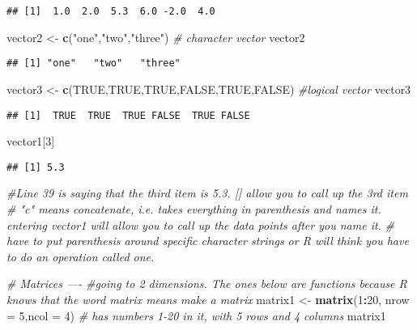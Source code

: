 \documentclass[]{article}
\newenvironment{Shaded}{\begin{snugshade}}{\end{snugshade}}
\newcommand{\KeywordTok}[1]{\textcolor[rgb]{0.13,0.29,0.53}{\textbf{#1}}}
\newcommand{\DataTypeTok}[1]{\textcolor[rgb]{0.13,0.29,0.53}{#1}}
\newcommand{\DecValTok}[1]{\textcolor[rgb]{0.00,0.00,0.81}{#1}}
\newcommand{\StringTok}[1]{\textcolor[rgb]{0.31,0.60,0.02}{#1}}
\newcommand{\CommentTok}[1]{\textcolor[rgb]{0.56,0.35,0.01}{\textit{#1}}}
\newcommand{\OtherTok}[1]{\textcolor[rgb]{0.56,0.35,0.01}{#1}}
\newcommand{\OperatorTok}[1]{\textcolor[rgb]{0.81,0.36,0.00}{\textbf{#1}}}
\newcommand{\NormalTok}[1]{#1}
\begin{document}
\begin{verbatim}
## [1]  1.0  2.0  5.3  6.0 -2.0  4.0
\end{verbatim}

\begin{Shaded}
\begin{Highlighting}[]
\NormalTok{vector2 <-}\StringTok{ }\KeywordTok{c}\NormalTok{(}\StringTok{"one"}\NormalTok{,}\StringTok{"two"}\NormalTok{,}\StringTok{"three"}\NormalTok{) }\CommentTok{# character vector}
\NormalTok{vector2}
\end{Highlighting}
\end{Shaded}

\begin{verbatim}
## [1] "one"   "two"   "three"
\end{verbatim}

\begin{Shaded}
\begin{Highlighting}[]
\NormalTok{vector3 <-}\StringTok{ }\KeywordTok{c}\NormalTok{(}\OtherTok{TRUE}\NormalTok{,}\OtherTok{TRUE}\NormalTok{,}\OtherTok{TRUE}\NormalTok{,}\OtherTok{FALSE}\NormalTok{,}\OtherTok{TRUE}\NormalTok{,}\OtherTok{FALSE}\NormalTok{) }\CommentTok{#logical vector}
\NormalTok{vector3}
\end{Highlighting}
\end{Shaded}

\begin{verbatim}
## [1]  TRUE  TRUE  TRUE FALSE  TRUE FALSE
\end{verbatim}

\begin{Shaded}
\begin{Highlighting}[]
\NormalTok{vector1[}\DecValTok{3}\NormalTok{] }
\end{Highlighting}
\end{Shaded}

\begin{verbatim}
## [1] 5.3
\end{verbatim}

\begin{Shaded}
\begin{Highlighting}[]
\CommentTok{#Line 39 is saying that the third item is 5.3. [] allow you to call up the 3rd item}
\CommentTok{# "c" means concatenate, i.e. takes everything in parenthesis and names it. entering vector1 will allow you to call up the data points after you name it.}
\CommentTok{# have to put parenthesis around specific character strings or R will think you have to do an operation called one. }

\CommentTok{# Matrices ----}
\CommentTok{#going to 2 dimensions. The ones below are functions because R knows that the word matrix means make a matrix}
\NormalTok{matrix1 <-}\StringTok{ }\KeywordTok{matrix}\NormalTok{(}\DecValTok{1}\OperatorTok{:}\DecValTok{20}\NormalTok{, }\DataTypeTok{nrow =} \DecValTok{5}\NormalTok{,}\DataTypeTok{ncol =} \DecValTok{4}\NormalTok{) }\CommentTok{# has numbers 1-20 in it, with 5 rows and 4 columns}
\NormalTok{matrix1}
\end{Highlighting}
\end{Shaded}
\end{document}
